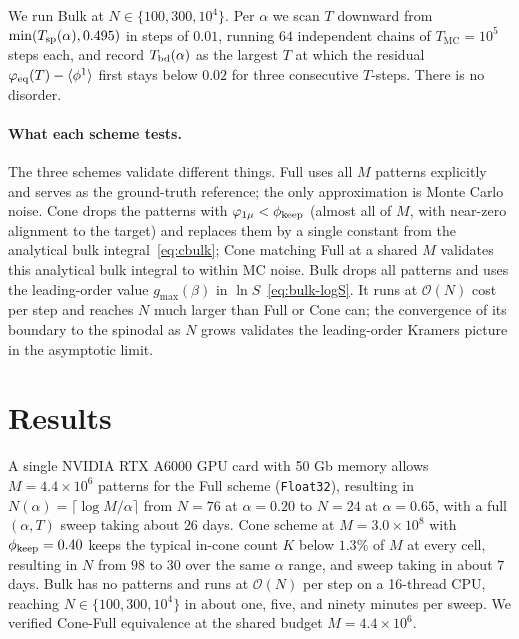 \documentclass[letterpaper]{article} %
\newcommand{\avg}[1]{\langle #1 \rangle}
\newcommand{\Bnet}{\beta}
\newcommand{\gmax}{g_{\max}}
\begin{document}
We run Bulk at $N \in \{100, 300, 10^4\}$.  Per $\alpha$ we scan $T$
downward from $\min(T_{\rm sp}(\alpha), 0.495)$ in steps of $0.01$,
running $64$ independent chains of $T_{\mathrm{MC}} = 10^5$ steps each,
and record $T_{\rm bd}(\alpha)$ as the largest $T$ at which the
residual $\varphi_{\rm eq}(T) - \avg{\phi^1}$ first stays below $0.02$
for three consecutive $T$-steps.  There is no disorder.

\paragraph{What each scheme tests.}
The three schemes validate different things.  Full uses all $M$
patterns explicitly and serves as the ground-truth reference; the
only approximation is Monte Carlo noise.  Cone drops the patterns
with $\varphi_{1\mu} < \phi_{\rm keep}$ (almost all of $M$, with
near-zero alignment to the target) and replaces them by a single
constant from the analytical bulk integral~\eqref{eq:cbulk}; Cone
matching Full at a shared $M$ validates this analytical bulk
integral to within MC noise.  Bulk drops all patterns and uses the
leading-order value $\gmax(\Bnet)$ in $\ln S$~\eqref{eq:bulk-logS}.
It runs at $\mathcal{O}(N)$ cost per step and reaches $N$ much
larger than Full or Cone can; the convergence of its boundary to the
spinodal as $N$ grows validates the leading-order Kramers picture in
the asymptotic limit.



\section{Results}
\label{sec:results}

A single NVIDIA RTX A6000 GPU card with 50 Gb memory allows 
$M = 4.4 \times 10^6$ patterns for the Full scheme (\texttt{Float32}), resulting in
$N(\alpha) = \lceil \log M / \alpha \rceil$ from $N = 76$ at
$\alpha = 0.20$ to $N = 24$ at $\alpha = 0.65$, with a full
$(\alpha, T)$ sweep taking about $26$ days.  Cone scheme at
$M = 3.0 \times 10^8$ with $\phi_{\rm keep} = 0.40$ keeps the typical
in-cone count $K$ below $1.3\%$ of $M$ at every cell, resulting in $N$ from
$98$ to $30$ over the same $\alpha$ range, and sweep taking in about $7$ days.  Bulk
has no patterns and runs at $\mathcal{O}(N)$ per step on a 16-thread
CPU, reaching $N \in \{100, 300, 10^4\}$ in about one, five, and
ninety minutes per sweep.  We verified Cone-Full equivalence at
the shared budget $M = 4.4 \times 10^6$.
\end{document}
